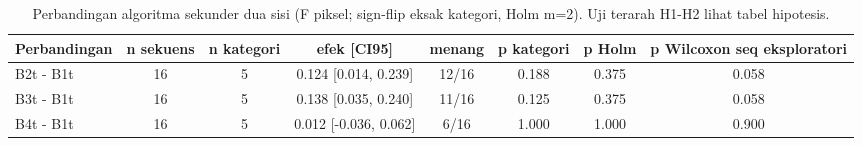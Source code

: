\begin{table}[t]
\centering
\caption{Perbandingan algoritma sekunder dua sisi (F piksel; sign-flip eksak kategori, Holm m=2). Uji terarah H1-H2 lihat tabel hipotesis.}
\label{tab:stats_primary}
\begin{tabular}{lccccccc}
\toprule
Perbandingan & n sekuens & n kategori & efek [CI95] & menang & p kategori & p Holm & p Wilcoxon seq eksploratori \\
\midrule
B2t - B1t & 16 & 5 & 0.124 [0.014, 0.239] & 12/16 & 0.188 & 0.375 & 0.058 \\
B3t - B1t & 16 & 5 & 0.138 [0.035, 0.240] & 11/16 & 0.125 & 0.375 & 0.058 \\
B4t - B1t & 16 & 5 & 0.012 [-0.036, 0.062] & 6/16 & 1.000 & 1.000 & 0.900 \\
\bottomrule
\end{tabular}
\end{table}

